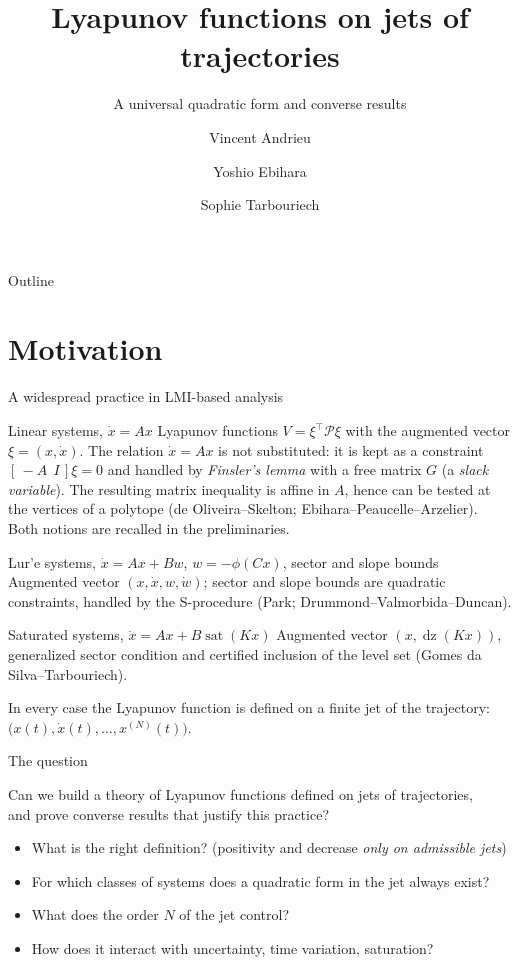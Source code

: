 \documentclass[10pt,aspectratio=169]{beamer}
\title[Lyapunov functions on jets]{Lyapunov functions on jets of trajectories}
\subtitle{A universal quadratic form and converse results}
\author[Andrieu, Ebihara, Tarbouriech]{Vincent Andrieu\inst{1} \and Yoshio Ebihara\inst{2} \and Sophie Tarbouriech\inst{3}}
\institute[LAGEPP, Kyushu, LAAS]{\inst{1} LAGEPP, Universit\'e Claude Bernard Lyon 1, CNRS \quad \inst{2} Kyushu University \quad \inst{3} LAAS-CNRS, Universit\'e de Toulouse}
\date{}
\newcommand{\tr}{^{\top}}
\newcommand{\PP}{\mathcal{P}}
\newcommand{\dz}{\operatorname{dz}}
\newcommand{\sat}{\operatorname{sat}}
\begin{document}
\begin{frame}
\titlepage
\end{frame}

\begin{frame}{Outline}
\tableofcontents
\end{frame}

\section{Motivation}

\begin{frame}{A widespread practice in LMI-based analysis}
\begin{block}{Linear systems, $\dot x=Ax$}
Lyapunov functions $V=\xi\tr\PP\xi$ with the augmented vector $\xi=(x,\dot x)$. The relation $\dot x=Ax$ is not substituted: it is kept as a constraint $[\,-A\ \ I\,]\xi=0$ and handled by \emph{Finsler's lemma} with a free matrix $G$ (a \emph{slack variable}). The resulting matrix inequality is affine in $A$, hence can be tested at the vertices of a polytope (de Oliveira--Skelton; Ebihara--Peaucelle--Arzelier). Both notions are recalled in the preliminaries.
\end{block}
\begin{block}{Lur'e systems, $\dot x=Ax+Bw$, $w=-\phi(Cx)$, sector and slope bounds}
Augmented vector $(x,\dot x,w,\dot w)$; sector and slope bounds are quadratic constraints, handled by the S-procedure (Park; Drummond--Valmorbida--Duncan).
\end{block}
\begin{block}{Saturated systems, $\dot x=Ax+B\sat(Kx)$}
Augmented vector $(x,\dz(Kx))$, generalized sector condition and certified inclusion of the level set (Gomes da Silva--Tarbouriech).
\end{block}
\medskip
\centering In every case the Lyapunov function is defined on a finite \alert{jet} of the trajectory: $\big(x(t),\dot x(t),\dots,x^{(N)}(t)\big)$.
\end{frame}

\begin{frame}{The question}
\begin{center}
\Large Can we build a theory of Lyapunov functions defined on jets of trajectories, \\ and prove \alert{converse} results that justify this practice?
\end{center}
\bigskip
\begin{itemize}
\item What is the right definition? (positivity and decrease \emph{only on admissible jets})
\item For which classes of systems does a quadratic form in the jet always exist?
\item What does the order $N$ of the jet control?
\item How does it interact with uncertainty, time variation, saturation?
\end{itemize}
\end{frame}
\end{document}
